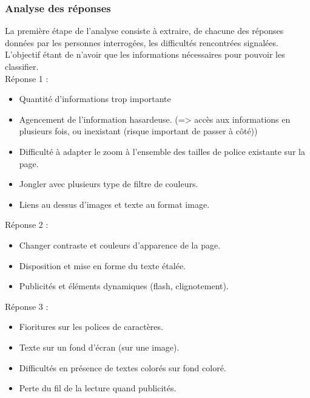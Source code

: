 \documentclass[french,a4paper]{report}
\begin{document}
{\subsubsection{Analyse des réponses}
La première étape de l'analyse consiste à extraire, de chacune des
réponses données par les personnes interrogées, les difficultés
rencontrées signalées. L'objectif étant de n'avoir que les
informations
nécessaires pour pouvoir les classifier.\\
Réponse 1 :
\begin{itemize}\setlength{\itemsep}{0.4\baselineskip}
\item Quantité d'informations trop importante
\item Agencement de l'information hasardeuse.
(=> accès aux informations en plusieurs fois, ou inexistant (risque important de passer à côté))
\item Difficulté à adapter le zoom à l'ensemble des tailles de police existante sur la page.
\item Jongler avec plusieurs type de filtre de couleurs.
\item Liens au dessus d'images et texte au format image.\\
\end{itemize}
Réponse 2 :
\begin{itemize}\setlength{\itemsep}{0.4\baselineskip}
\item Changer contraste et couleurs d'apparence de la page.
\item Disposition et mise en forme du texte étalée.
\item Publicités et éléments dynamiques (flash, clignotement).\\
\end{itemize}
Réponse 3 :
\begin{itemize}\setlength{\itemsep}{0.4\baselineskip}
\item Fioritures sur les polices de caractères.
\item Texte sur un fond d'écran (sur une image).
\item Difficultés en présence de textes colorés sur fond coloré.
\item Perte du fil de la lecture quand publicités.\\
\end{itemize}
}
\end{document}
